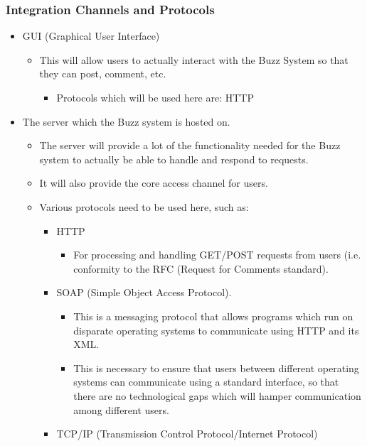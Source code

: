 \documentclass[11pt]{article}
\begin{document}
	\subsubsection{Integration Channels and Protocols}
	\begin{itemize}
	\item GUI (Graphical User Interface)
		\begin{itemize}
			\item This will allow users to actually interact with the Buzz System so that they can post, comment, etc. 
			\begin{itemize}
				\item Protocols which will be used here are: HTTP
			\end{itemize}
		\end{itemize}
	\item The server which the Buzz system is hosted on.
		\begin{itemize}
			\item The server will provide a lot of the functionality needed for the Buzz system to actually be able to handle and respond to requests.
			\item It will also provide the core access channel for users. 
			\item Various protocols need to be used here, such as:
				\begin{itemize}
					\item HTTP
						\begin{itemize}
							\item For processing and handling GET/POST requests from users (i.e. conformity to the RFC (Request for Comments standard).
						\end{itemize}
					\item SOAP (Simple Object Access Protocol). 
						\begin{itemize}
							\item This is a messaging protocol that allows programs which run on disparate operating systems to communicate using HTTP and its XML. 
							\item This is necessary to ensure that users between different operating systems can communicate using a standard interface, so that there are no technological gaps which will hamper communication among different users.
						\end{itemize}
					\item TCP/IP (Transmission Control Protocol/Internet Protocol)
						\begin{itemize}

\end{itemize}
\end{itemize}
\end{itemize}
\end{itemize}
\end{document}
